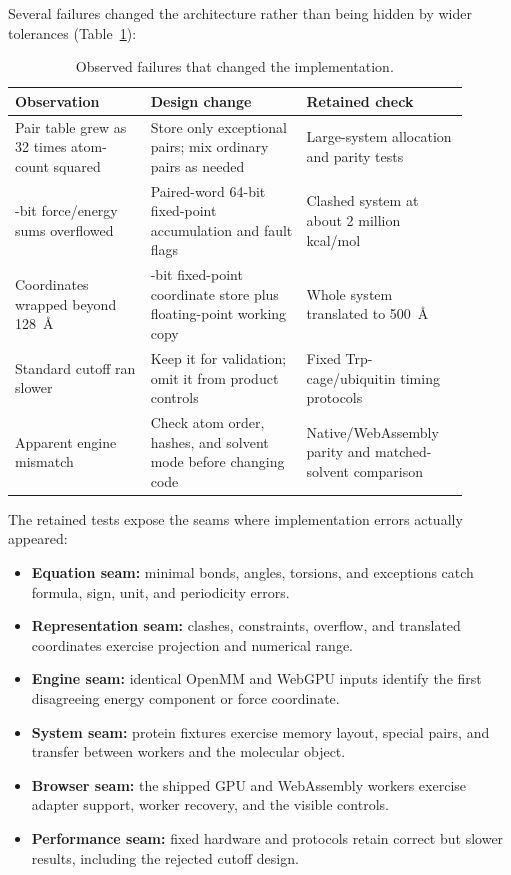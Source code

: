 Several failures changed the architecture rather than being hidden by wider
tolerances (Table~\ref{tab:architecture-failures}):

\begin{table}[htbp]
  \centering
  \caption{Observed failures that changed the implementation.}
  \label{tab:architecture-failures}
  \footnotesize
  \renewcommand{\arraystretch}{1.06}
  \begin{tabular}{@{}>{\raggedright\arraybackslash}p{0.27\linewidth}
                       >{\raggedright\arraybackslash}p{0.31\linewidth}
                       >{\raggedright\arraybackslash}p{0.32\linewidth}@{}}
    \toprule
    Observation & Design change & Retained check \\
    \midrule
    Pair table grew as 32 times atom-count squared & Store only exceptional pairs; mix
      ordinary pairs as needed & Large-system allocation and parity tests \\
    32-bit force/energy sums overflowed & Paired-word 64-bit fixed-point
      accumulation and fault flags & Clashed system at about 2 million kcal/mol \\
    Coordinates wrapped beyond 128~\AA & 64-bit fixed-point coordinate store
      plus floating-point working copy & Whole system translated to 500~\AA \\
    Standard cutoff ran slower & Keep it for validation; omit it from product
      controls & Fixed Trp-cage/ubiquitin timing protocols \\
    Apparent engine mismatch & Check atom order, hashes, and solvent mode before
      changing code & Native/WebAssembly parity and matched-solvent comparison \\
    \bottomrule
  \end{tabular}
\end{table}
\FloatBarrier

The retained tests expose the seams where implementation errors actually
appeared:

\begin{itemize}
  \item \textbf{Equation seam:} minimal bonds, angles, torsions, and exceptions
    catch formula, sign, unit, and periodicity errors.
  \item \textbf{Representation seam:} clashes, constraints, overflow, and
    translated coordinates exercise projection and numerical range.
  \item \textbf{Engine seam:} identical OpenMM and WebGPU inputs identify the
    first disagreeing energy component or force coordinate.
  \item \textbf{System seam:} protein fixtures exercise memory layout, special
    pairs, and transfer between workers and the molecular object.
  \item \textbf{Browser seam:} the shipped GPU and WebAssembly workers exercise
    adapter support, worker recovery, and the visible controls.
  \item \textbf{Performance seam:} fixed hardware and protocols retain correct
    but slower results, including the rejected cutoff design.
\end{itemize}

